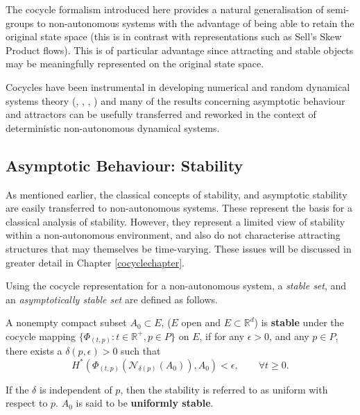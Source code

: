 The cocycle formalism introduced here provides a natural generalisation of semi-groups to non-autonomous systems with the advantage of being able to retain the original state space (this is in contrast with representations such as Sell's Skew Product flows). This is of particular advantage since attracting and stable objects may be meaningfully represented on the original state space.

Cocycles have been instrumental in developing numerical and random dynamical systems theory (\cite{Ar98}, \cite{FlSc96}, \cite{CrFl94}, \cite{Sc92}) and many of the results concerning asymptotic behaviour and attractors can be usefully transferred and reworked in the context of deterministic non-autonomous dynamical systems.

\subsection{Asymptotic Behaviour: Stability}

As mentioned earlier, the classical concepts of stability, and
asymptotic stability are easily transferred to non-autonomous
systems. These represent the basis for a classical analysis of
stability. However, they represent a limited view of stability
within a non-autonomous environment, and also  do not characterise
attracting structures that may themselves be time-varying. These
issues will be discussed in greater detail in Chapter
\ref{cocyclechapter}.

Using the cocycle representation for a non-autonomous system, a
{\em stable set}, and an {\em asymptotically stable set} are
defined as follows.

\begin{defn}[Stability]\label{Stable}
   A nonempty compact subset $A_0 \subset E$, ($E$ open and $E
   \subset \mathbb{R}^d$) is {\bf stable} under the cocycle mapping
   $\{ \Phi_{(t,p)} : t \in \mathbb{R}^+, p \in P\}$ on $E$, if for any
   $\epsilon > 0$, and any $p \in P$, there exists a $\delta(p,
   \epsilon)>0$ such that
   \begin{equation}\label{SS}
   H^*(\Phi_{(t,p)}(\mathcal{N}_{\delta(p)}(A_0)),A_0) < \epsilon,
            \qquad \forall t \geq 0.
   \end{equation}
\end{defn}

If the $\delta$ is independent of $p$, then the stability is
referred to as uniform with respect to $p$. $A_0$ is said to be
{\bf uniformly stable}.

